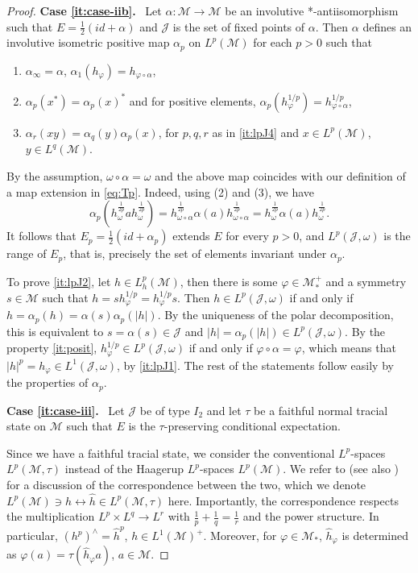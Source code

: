 \documentclass[12pt]{article}
\def\Me{\mathcal M}
\def\Je{\mathcal J}
\theoremstyle{definition}
\theoremstyle{remark}
\begin{document}
\begin{proof}
\textbf{Case \ref{it:case-iib}.}~
Let $\alpha:\Me\to \Me$ be an involutive *-antiisomorphism such that
$E=\frac12(id+\alpha)$ and $\Je$ is the set of fixed points of $\alpha$. 
Then $\alpha$ defines an involutive isometric positive map $\alpha_p$ on $L^p(\Me)$ for
each $p>0$ such that 
\begin{enumerate}[(1)]
\item $\alpha_\infty=\alpha$, $\alpha_1(h_\varphi)=h_{\varphi\circ\alpha}$,
\item \label{it:posit} $\alpha_p(x^*)=\alpha_p(x)^*$ and  for positive elements, $\alpha_p(h_\varphi^{1/p})=h_{\varphi\circ\alpha}^{1/p}$,
\item $\alpha_r(xy)=\alpha_q(y)\alpha_p(x)$, for $p,q,r$ as in \ref{it:lpJ4}  and $x\in L^p(\Me)$,
$y\in L^q(\Me)$.
\end{enumerate}
By the assumption, $\omega\circ\alpha=\omega$ and the above map coincides with our
definition of a map extension in \eqref{eq:Tp}. Indeed, using (2) and (3), we have
\[
\alpha_p(h_\omega^{\frac1{2p}}ah_\omega^{\frac1{2p}})=h_{\omega\circ\alpha}^{\frac1{2p}}\alpha(a)h_{\omega\circ\alpha}^{\frac1{2p}}=h_\omega^{\frac1{2p}}\alpha(a)h_\omega^{\frac1{2p}}.
\]
It follows that $E_p=\frac12(id+\alpha_p)$ extends $E$ for every $p>0$, and
$L^p(\Je,\omega)$ is the range of $E_p$, that is, precisely the set of
elements invariant under $\alpha_p$. 


To prove \ref{it:lpJ2}, let  $h\in L_h^p(\Me)$, then there is some $\varphi\in
\Me_*^+$ and a symmetry $s\in \Me$ such that $h=sh_\varphi^{1/p}=h_\varphi^{1/p}s$.
Then $h\in L^p(\Je,\omega)$ if and only if $h=\alpha_p(h)=\alpha(s)\alpha_p(|h|)$. By the uniqueness of the polar
decomposition, this is equivalent to $s=\alpha(s)\in \Je$ and $|h|=\alpha_p(|h|)\in
L^p(\Je,\omega)$. By the property \ref{it:posit}, $h_\varphi^{1/p}\in L^p(\Je,\omega)$ if and only if
$\varphi\circ\alpha=\varphi$, which means that $|h|^p=h_{\varphi}\in L^1(\Je,\omega)$, by
\ref{it:lpJ1}. The rest of the statements follow easily by the properties of $\alpha_p$.


\textbf{Case \ref{it:case-iii}.}~
Let $\Je$ be of type $I_2$ and let $\tau$ be a faithful normal tracial
state on $\Me$ such that $E$ is the $\tau$-preserving conditional expectation. 

Since we have a faithful tracial state, we consider the conventional $L^p$-spaces $L^p(\Me,\tau)$ instead of the Haagerup $L^p$-spaces $L^p(\Me)$.
We refer to \cite{terp1981lpspaces} (see also \cite[Sec.~A.6]{hiai2018quantum}) for a discussion of the correspondence between the two, which we denote $L^p(\Me)\ni h \leftrightarrow \hat h \in L^p(\Me,\tau)$ here.
Importantly, the correspondence respects the multiplication $L^p \times L^q \to L^r$ with
$\frac 1p+\frac1q=\frac1r$ and the power structure. In particular, $(h^p)^\wedge =
\hat h^p$, $h\in L^1(\Me)^+$. Moreover, for $\varphi\in \Me_*$, $\hat h_\varphi$ is
determined as $\varphi(a)= \tau(\hat h_\varphi a)$, $a\in \Me$. 


\end{proof}
\end{document}
